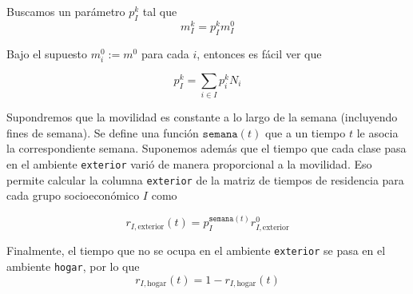 Buscamos un parámetro \(p_I^k\) tal que 
\[
m_I^k = p_I^k m_I^0
\]

Bajo el supuesto \(m_i^0 := m^0\) para cada \(i\), entonces es fácil ver que

\[
p_I^k = \sum_{i \in I} p_i^k N_i
\]

Supondremos que la movilidad es constante a lo largo de la semana (incluyendo fines de semana). Se define una función \(\mathtt{semana}(t)\) que a un tiempo \(t\) le asocia la correspondiente semana. Suponemos además que el tiempo que cada clase pasa en el ambiente \texttt{exterior} varió de manera proporcional a la movilidad. Eso permite calcular la columna \texttt{exterior} de la matriz de tiempos de residencia para cada grupo socioeconómico \(I\) como

\[
r_{I, \text{exterior}}(t) = p_I^{\mathtt{semana}(t)} r_{I,\text{exterior}}^0
\]





Finalmente, el tiempo que no se ocupa en el ambiente \texttt{exterior} se pasa en el ambiente \texttt{hogar}, por lo que 
\[
r_{I, \text{hogar}}(t) = 1 - r_{I,\text{hogar}}(t)
\]